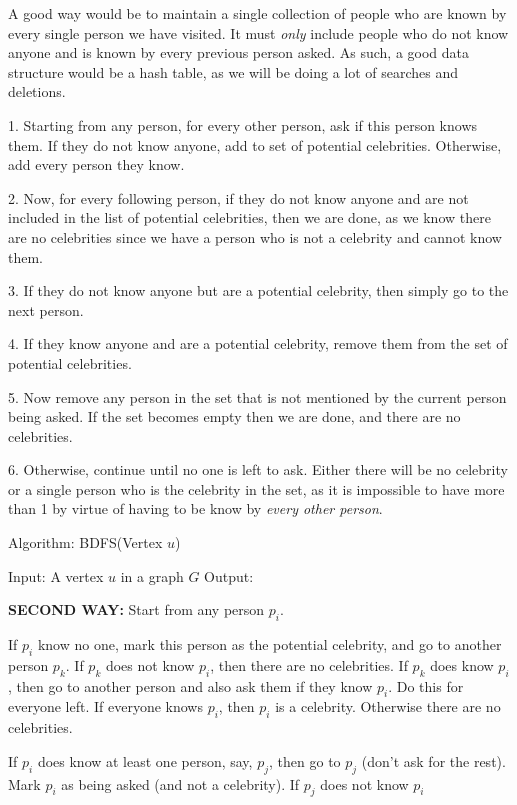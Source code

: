 \documentclass[11pt,letterpaper]{article}
\begin{document}
		A good way would be to maintain a single collection of people who are known by every single person we have visited. It must \textit{only} include people who do not know anyone and is known by every previous person asked.
		As such, a good data structure would be a hash table, as we will be doing a lot of searches and deletions.
		
		1. Starting from any person, for every other person, ask if this person knows them. If they do not know anyone, add to set of potential celebrities. Otherwise, add every person they know.
		
		2. Now, for every following person, if they do not know anyone and are not included in the list of potential celebrities, then we are done, as we know there are no celebrities since we have a person who is not a celebrity and cannot know them.
		
		3. If they do not know anyone but are a potential celebrity, then simply go to the next person.
		
		4. If they know anyone and are a potential celebrity, remove them from the set of potential celebrities.
		
		5. Now remove any person in the set that is not mentioned by the current person being asked. If the set becomes empty then we are done, and there are no celebrities.
		
		6. Otherwise, continue until no one is left to ask. Either there will be no celebrity or a single person who is the celebrity in the set, as it is impossible to have more than 1 by virtue of having to be know by \textit{every other person}.
		\begin{center}
			Algorithm: BDFS(Vertex $u$)
		\end{center}
		\begin{algorithm}[caption={}, label={alg1}]
			Input: A vertex $u$ in a graph $G$
			Output: 
			
			
		\end{algorithm}
		\textbf{SECOND WAY:}
		Start from any person $p_i$.
		
		If $p_i$ know no one, mark this person as the potential celebrity, and go to another person $p_k$.
		If $p_k$ does not know $p_i$, then there are no celebrities.
		If $p_k$ does know $p_i$, then go to another person and also ask them if they know $p_i$. Do this for everyone left.
		If everyone knows $p_i$, then $p_i$ is a celebrity.
		Otherwise there are no celebrities.
		
		If $p_i$ does know at least one person, say, $p_j$, then go to $p_j$ (don't ask for the rest). Mark $p_i$ as being asked (and not a celebrity).
		If $p_j$ does not know $p_i$
	
\end{document}
